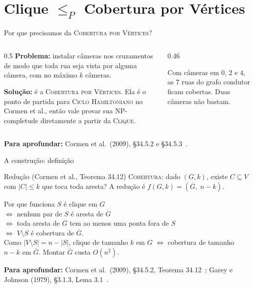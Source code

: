 \documentclass[aspectratio=169,xcolor=table]{beamer}
\newcommand{\arestashexa}{0/1, 1/2, 2/3, 3/4, 4/5, 5/0, 0/2}
\newcommand{\noshexa}{%
  \foreach \i in {0,...,5} \node[vert] (h\i) at ({90+60*\i}:0.95) {\i};
}
\newcommand{\grafohexa}[3]{%
  \noshexa
  \def\listaA{#3}\ifx\listaA\empty\else
    \foreach \u/\v in {#3} \draw[ares] (h\u) -- (h\v);\fi
  \foreach \u/\v in #1 \draw[aresta] (h\u) -- (h\v);
  \def\listaV{#2}\ifx\listaV\empty\else
    \foreach \v in {#2} \node[vS] at (h\v) {\v};\fi
}
\newcommand{\fonte}[1]{%
  \vfill
  {\tiny\color{gray!55!black}\textbf{Para aprofundar:} #1\par}%
}
\newcommand{\prob}[1]{\textsc{#1}}
\begin{document}
\section{Clique $\le_P$ Cobertura por Vértices}

\begin{frame}{Por que precisamos da \prob{Cobertura por Vértices}?}
  \begin{columns}[T]
    \begin{column}{0.5\textwidth}
      \small
      \textbf{Problema:} instalar câmeras nos cruzamentos de modo que toda rua seja vista por
      alguma câmera, com no máximo $k$ câmeras.
      \medskip

      \textbf{Solução:} é a \prob{Cobertura por Vértices}. Ela é o ponto de partida para
      \prob{Ciclo Hamiltoniano} no Cormen et al., então vale provar sua NP-completude
      diretamente a partir da \prob{Clique}.
    \end{column}
    \begin{column}{0.46\textwidth}
      \begin{center}
      \end{center}
      {\scriptsize Com câmeras em $0$, $2$ e $4$, as $7$ ruas do grafo condutor ficam
      cobertas. Duas câmeras não bastam.\par}
    \end{column}
  \end{columns}
  \fonte{Cormen et al.\ (2009), \S 34.5.2 e \S 34.5.3~\cite{cormen2009introduction}.}
\end{frame}

\begin{frame}{A construção: definição}
  \begin{block}{Redução (Cormen et al., Teorema 34.12)}
    \small
    \prob{Cobertura}: dado $(G, k)$, existe $C \subseteq V$ com $|C| \le k$ que toca toda
    aresta? A redução é $f(G, k) = (\overline{G},\; n - k)$.
  \end{block}
  \begin{exampleblock}{Por que funciona}
    \scriptsize
    $S$ é clique em $G$\\
    $\iff$ nenhum par de $S$ é aresta de $\overline{G}$\\
    $\iff$ toda aresta de $\overline{G}$ tem ao menos uma ponta fora de $S$\\
    $\iff$ $V \setminus S$ é cobertura de $\overline{G}$.\\[2pt]
    Como $|V \setminus S| = n - |S|$, clique de tamanho $k$ em $G$ $\iff$ cobertura de tamanho
    $n - k$ em $\overline{G}$. Montar $\overline{G}$ custa $O(n^2)$.
  \end{exampleblock}
  \fonte{Cormen et al.\ (2009), \S 34.5.2, Teorema 34.12~\cite{cormen2009introduction};
    Garey e Johnson (1979), \S 3.1.3, Lema 3.1~\cite{garey1979computers}.}
\end{frame}
\end{document}
